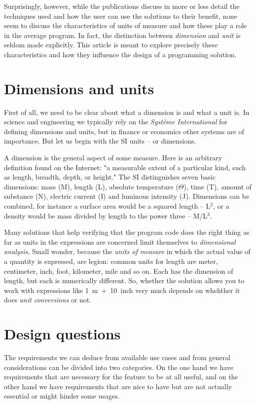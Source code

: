 \documentclass{article}
\begin{document}
Surprisingly, however, while the publications discuss in more or less detail the techniques used and how the user can use
the solutions to their benefit, none seem to discuss the characteristics of units of measure and how these play a role
in the average program. In fact, the distinction between \emph{dimension} and \emph{unit} is seldom made explicitly. This
article is meant to explore precisely these characteristics and how they influence the design of a programming solution.


\section{Dimensions and units}
First of all, we need to be clear about what a dimension is and what a unit is. In science and engineering we typically
rely on the \emph{Syst\`eme International} for defining dimensions and units, but in finance or economics other systems
are of importance. But let us begin with the SI units -- or dimensions.

A dimension is the general aspect of some measure. Here is an arbitrary definition found on the Internet:
"a measurable extent of a particular kind, such as length, breadth, depth, or height." The SI distinguishes seven
basic dimensions: mass (M), length (L), absolute temperature ($\Theta$), time (T), amount of substance (N), electric current (I)
and luminous intensity (J). Dimensions can be combined, for instance a surface area would be a squared length -- L$^2$, or
a density would be mass divided by length to the power three -- M/L$^3$.

Many solutions that help verifying that the program code does the right thing as far as units in the expressions are concerned
limit themselves to \emph{dimensional analysis}. Small wonder, because the \emph{units of measure} in which the actual
value of a quantity is expressed, are legion: common units for length are meter, centimeter, inch, foot, kilometer, mile and
so on. Each has the dimension of length, but each is numerically different. So, whether the solution allows you to work with
expressions like 1~m~+~10~inch very much depends on whehther it does \emph{unit conversions} or not.


\section{Design questions}
The requirements we can deduce from available use cases and from general considerations can be divided
into two categories. On the one hand we have requirements that are necessary for the feature to be at all useful, and
on the other hand we have requirements that are nice to have but are not actually essential or might
hinder some usages.
\end{document}
